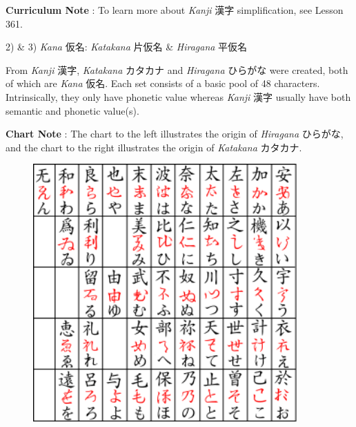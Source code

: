 \par{\textbf{Curriculum Note }: To learn more about \emph{Kanji }漢字 simplification, see Lesson 361. }

\par{2) \& 3) \emph{Kana }仮名: \emph{Katakana }片仮名 \& \emph{Hiragana }平仮名 }

\par{ From \emph{Kanji }漢字, \emph{Katakana }カタカナ and \emph{Hiragana }ひらがな were created, both of which are \emph{Kana }仮名. Each set consists of a basic pool of 48 characters. Intrinsically, they only have phonetic value whereas \emph{Kanji }漢字 usually have both semantic and phonetic value(s). }

\par{\textbf{Chart Note }: The chart to the left illustrates the origin of \emph{Hiragana }ひらがな, and the chart to the right illustrates the origin of \emph{Katakana }カタカナ. }
 
\begin{figure}[h]
\centering

\includegraphics[width=0.9\textwidth]{figs/第01章/第7課:_10majoraspects_fig/Hiragana_Origins.png}

\end{figure}

